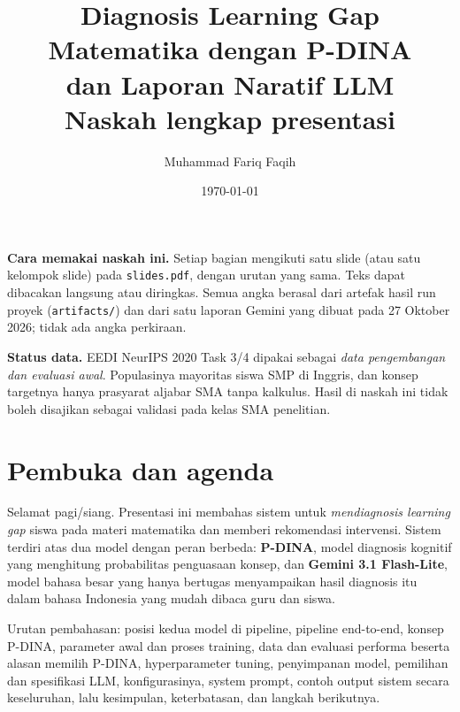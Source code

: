 \documentclass[11pt,a4paper]{article}
\title{\color{navy}\bfseries Diagnosis Learning Gap Matematika dengan P-DINA\\ dan Laporan Naratif LLM\\[4pt]
  \large\mdseries Naskah lengkap presentasi}
\author{Muhammad Fariq Faqih}
\date{\today}
\begin{document}
\maketitle
\thispagestyle{empty}

\begin{catatan}
  \textbf{Cara memakai naskah ini.} Setiap bagian mengikuti satu slide (atau satu kelompok slide) pada
  \texttt{slides.pdf}, dengan urutan yang sama. Teks dapat dibacakan langsung atau diringkas. Semua angka berasal dari
  artefak hasil run proyek (\texttt{artifacts/}) dan dari satu laporan Gemini yang dibuat pada 27 Oktober 2026; tidak
  ada angka perkiraan.
\end{catatan}

\begin{peringatan}
  \textbf{Status data.} EEDI NeurIPS 2020 Task 3/4 dipakai sebagai \emph{data pengembangan dan evaluasi awal}.
  Populasinya mayoritas siswa SMP di Inggris, dan konsep targetnya hanya prasyarat aljabar SMA tanpa kalkulus. Hasil di
  naskah ini tidak boleh disajikan sebagai validasi pada kelas SMA penelitian.
\end{peringatan}

\tableofcontents
\newpage

\section{Pembuka dan agenda}

Selamat pagi/siang. Presentasi ini membahas sistem untuk \emph{mendiagnosis learning gap} siswa pada materi
matematika dan memberi rekomendasi intervensi. Sistem terdiri atas dua model dengan peran berbeda: \textbf{P-DINA},
model diagnosis kognitif yang menghitung probabilitas penguasaan konsep, dan \textbf{Gemini 3.1 Flash-Lite}, model
bahasa besar yang hanya bertugas menyampaikan hasil diagnosis itu dalam bahasa Indonesia yang mudah dibaca guru dan
siswa.

Urutan pembahasan: posisi kedua model di pipeline, pipeline end-to-end, konsep P-DINA, parameter awal dan proses
training, data dan evaluasi performa beserta alasan memilih P-DINA, hyperparameter tuning, penyimpanan model,
pemilihan dan spesifikasi LLM, konfigurasinya, system prompt, contoh output sistem secara keseluruhan, lalu
kesimpulan, keterbatasan, dan langkah berikutnya.

\end{document}
